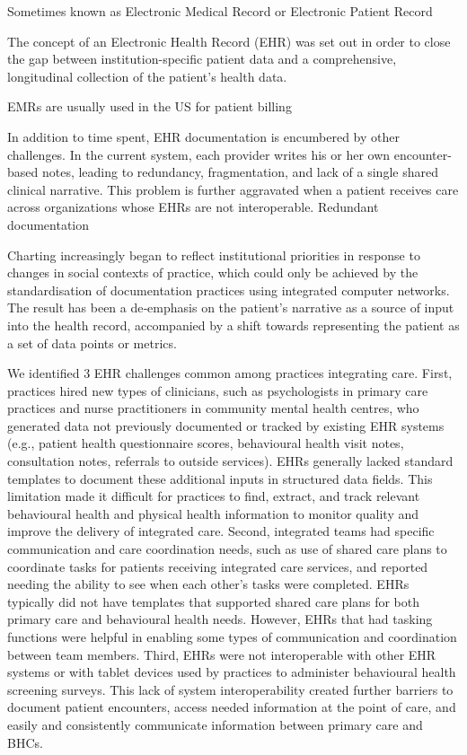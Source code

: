  

Sometimes known as Electronic Medical Record or Electronic Patient Record

The concept of an Electronic Health Record (EHR) was set out in order to close the gap between institution-specific patient data and a comprehensive, longitudinal collection of the patient's health data. \cite{quaglio2016health}

EMRs are usually used in the US for patient billing
\cite{alpert2019electronic}


In addition to time spent, EHR documentation is encumbered by other challenges. In the current system, each provider writes his or her own encounter-based notes, leading to redundancy, fragmentation, and lack of a single shared clinical narrative. This problem is further aggravated when a patient receives care across organizations whose EHRs are not interoperable. Redundant documentation \cite{warner2019s}


Charting increasingly began to reflect institutional priorities in response to changes in social contexts of practice, which could only be achieved by the standardisation of documentation practices using integrated computer networks. The result has been a de‐emphasis on the patient's narrative as a source of input into the health record, accompanied by a shift towards representing the patient as a set of data points or metrics.
\cite{doi:10.1111/nup.12112}

We identified 3 EHR challenges common among practices integrating care. First, practices hired new types of clinicians, such as psychologists in primary care practices and nurse practitioners in community mental health centres, who generated data not previously documented or tracked by existing EHR systems (e.g., patient health questionnaire  scores, behavioural health visit notes, consultation notes, referrals to outside services). EHRs generally lacked standard templates to document these additional inputs in structured data fields. This limitation made it difficult for practices to find, extract, and track relevant behavioural health and physical health information to monitor quality and improve the delivery of integrated care. Second, integrated teams had specific communication and care coordination needs, such as use of shared care plans to coordinate tasks for patients receiving integrated care services, and reported needing the ability to see when each other's tasks were completed. EHRs typically did not have templates that supported shared care plans for both primary care and behavioural health needs. However, EHRs that had tasking functions were helpful in enabling some types of communication and coordination between team members. Third, EHRs were not interoperable with other EHR systems or with tablet devices used by practices to administer behavioural health screening surveys. This lack of system interoperability created further barriers to document patient encounters, access needed information at the point of care, and easily and consistently communicate information between primary care and BHCs.
\cite{cifuentes2015electronic}

